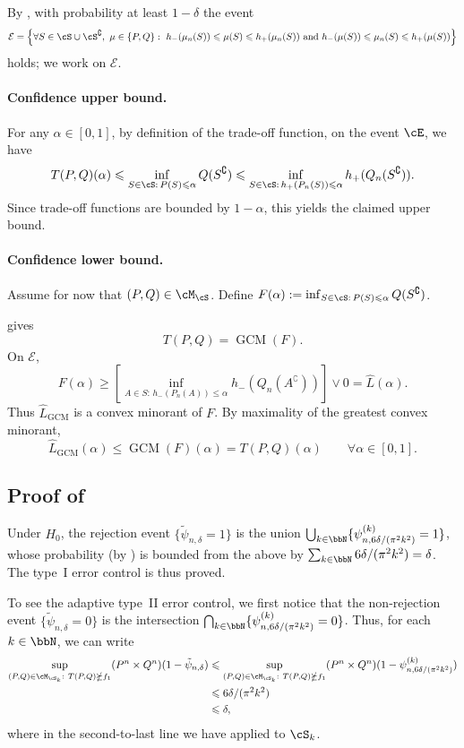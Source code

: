 \documentclass[english]{article}
\theoremstyle{plain}
\theoremstyle{definition}
\newcommand{\Toff}[2]{T(#1,#2)}
\newcommand{\falt}{f_1}
\newcommand{\hup}{h_+}                             %
\newcommand{\hdown}{h_-}                           %
\begin{document}
By , with probability at least $1-\delta$ the event
\[
\mathcal E=\Bigl\{\forall S\in\cS\cup\cS^\complement,\ \mu\in\{P,Q\}:\ \hdown(\mu_n(S))\leqslant\mu(S)\leqslant\hup(\mu_n(S))\ \text{and}\ \hdown(\mu(S))\leqslant\mu_n(S)\leqslant\hup(\mu(S))\Bigr\}
\]
holds; we work on $\mathcal E$.

\paragraph{Confidence upper bound.}
For any $\alpha\in[0,1]$, by definition of the trade-off function, on the event $\cE$, we have 
\[
\Toff{P}{Q}(\alpha)\leqslant \inf_{S\in\cS:\,P(S)\leqslant\alpha}Q(S^\complement)
\leqslant \inf_{S\in\cS:\,\hup(P_n(S))\leqslant\alpha}\hup(Q_n(S^\complement)).
\]
Since trade-off functions are bounded by $1-\alpha$, this yields the claimed upper bound.

\paragraph{Confidence lower bound.}
Assume for now that $(P,Q) \in \cM_\cS$. Define $F(\alpha):=\inf_{S\in\cS:\,P(S)\leqslant\alpha}Q(S^\complement)$. 

 gives
\[
T(P,Q)=\operatorname{GCM}(F).
\] On $\mathcal E$,
\[
F(\alpha)\geqslant
\left[
\inf_{A\in S:\,h_-(P_n(A))\leqslant \alpha} h_-(Q_n(A^{\complement}))
\right]\vee 0
=
\widehat L(\alpha).
\]
Thus $\widehat L_{\mathrm{GCM}}$ is a convex minorant of $F$. By maximality of the greatest convex
minorant,
\[
\widehat L_{\mathrm{GCM}}(\alpha)\leqslant \operatorname{GCM}(F)(\alpha)=T(P,Q)(\alpha)
\qquad\forall \alpha\in[0,1].
\]


\subsection{Proof of }

Under $H_0$, the rejection event $\{\tilde{\psi}_{n,\delta}=1\}$ is the union $\bigcup_{k\in\bbN}\{\psi^{(k)}_{n,6\delta/(\pi^2k^2)}=1\}$, whose probability (by ) is bounded from the above by $ \sum_{k\in\bbN}6\delta/(\pi^2k^2)=\delta$. The type~I error control is thus proved.

To see the adaptive type~II error control, we first notice that the non-rejection event $\{\tilde{\psi}_{n,\delta}=0\}$ is the intersection $\bigcap_{k\in\bbN}\{\psi^{(k)}_{n,6\delta/(\pi^2k^2)}=0\}$. Thus, for each $k\in\bbN$, we can write
\begin{align*}
    \sup_{(P,Q)\in\cM_{\cS_k}:\ \Toff{P}{Q}\nsucceq \falt} (P^n\times Q^n)(1-\tilde{\psi}_{n,\delta})&\leqslant  \sup_{(P,Q)\in\cM_{\cS_k}:\ \Toff{P}{Q}\nsucceq \falt} (P^n\times Q^n)(1-\psi^{(k)}_{n,6\delta/(\pi^2k^2)})\\
    &\leqslant 6\delta/(\pi^2k^2)\\
    &\leqslant \delta,
\end{align*}
where in the second-to-last line we have applied  to $\cS_k$.
\end{document}
